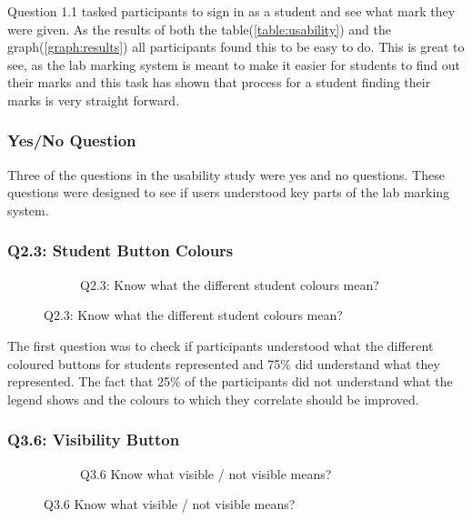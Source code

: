 \documentclass[12pt]{article}  %
\begin{document}
\noindent Question 1.1 tasked participants to sign in as a student and see what mark they were given. As the results of both the table(\ref{table:usability}) and the graph(\ref{graph:results}) all participants found this to be easy to do. This is great to see, as the lab marking system is meant to make it easier for students to find out their marks and this task has shown that process for a student finding their marks is very straight forward.


\subsubsection*{Yes/No Question}
Three of the questions in the usability study were yes and no questions. These questions were designed to see if users understood key parts of the lab marking system.

\subsubsection*{Q2.3: Student Button Colours}

\begin{figure}
\vspace*{-\baselineskip}
\begin{figure}[H]
\caption{Q2.3: Know what the different student colours mean?}


\end{figure}
\end{figure}

The first question was to check if participants understood what the different coloured buttons for students represented and 75\% did understand what they represented. The fact that 25\% of the participants did not understand what the legend shows and the colours to which they correlate should be improved.




\subsubsection*{Q3.6: Visibility Button}

\begin{figure}
\vspace*{-\baselineskip}
\begin{figure}[H]
\caption{Q3.6 Know what visible / not visible means?}


\end{figure}
\end{figure}
\end{document}
